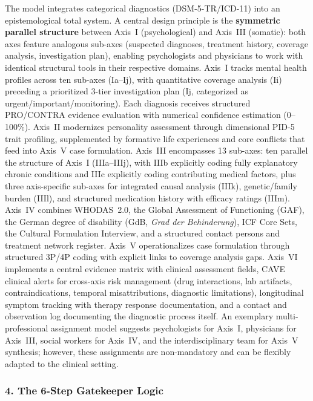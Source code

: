 \documentclass[11pt,a4paper]{article}
\begin{document}
The model integrates categorical diagnostics (DSM-5-TR/ICD-11) into an epistemological total system. A central design principle is the \textbf{symmetric parallel structure} between Axis~I (psychological) and Axis~III (somatic): both axes feature analogous sub-axes (suspected diagnoses, treatment history, coverage analysis, investigation plan), enabling psychologists and physicians to work with identical structural tools in their respective domains. Axis~I tracks mental health profiles across ten sub-axes (Ia--Ij), with quantitative coverage analysis (Ii) preceding a prioritized 3-tier investigation plan (Ij, categorized as urgent/important/monitoring). Each diagnosis receives structured PRO/CONTRA evidence evaluation with numerical confidence estimation (0--100\%). Axis~II modernizes personality assessment through dimensional PID-5 trait profiling, supplemented by formative life experiences and core conflicts that feed into Axis~V case formulation. Axis~III encompasses 13 sub-axes: ten parallel the structure of Axis~I (IIIa--IIIj), with IIIb explicitly coding fully explanatory chronic conditions and IIIc explicitly coding contributing medical factors, plus three axis-specific sub-axes for integrated causal analysis (IIIk), genetic/family burden (IIIl), and structured medication history with efficacy ratings (IIIm). Axis~IV combines WHODAS~2.0, the Global Assessment of Functioning (GAF), the German degree of disability (GdB, \textit{Grad der Behinderung}), ICF Core Sets, the Cultural Formulation Interview, and a structured contact persons and treatment network register. Axis~V operationalizes case formulation through structured 3P/4P coding with explicit links to coverage analysis gaps. Axis~VI implements a central evidence matrix with clinical assessment fields, CAVE clinical alerts for cross-axis risk management (drug interactions, lab artifacts, contraindications, temporal misattributions, diagnostic limitations), longitudinal symptom tracking with therapy response documentation, and a contact and observation log documenting the diagnostic process itself. An exemplary multi-professional assignment model suggests psychologists for Axis~I, physicians for Axis~III, social workers for Axis~IV, and the interdisciplinary team for Axis~V synthesis; however, these assignments are non-mandatory and can be flexibly adapted to the clinical setting.

\subsubsection*{4. The 6-Step Gatekeeper Logic}
\end{document}
